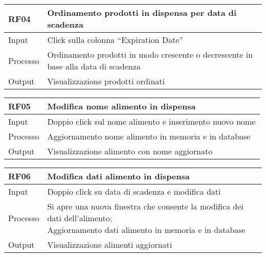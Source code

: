 \begin{table}[H]
    \begin{flushleft}
      \begin{tabular}{l|l}
        \toprule
        \textbf{RF04} & \textbf{Ordinamento prodotti in dispensa per data di scadenza}\\
        \midrule
        Input & Click sulla colonna “Expiration Date”\\
        Processo & Ordinamento prodotti in modo crescente o decrescente in base alla data di scadenza\\
        Output & Visualizzazione prodotti ordinati\\
        \bottomrule
      \end{tabular}
    \end{flushleft}
\end{table}

\begin{table}[H]
    \begin{flushleft}
      \begin{tabular}{l|l}
        \toprule
        \textbf{RF05} & \textbf{Modifica nome alimento in dispensa}\\
        \midrule
        Input & Doppio click sul nome alimento e inserimento nuovo nome\\
        Processo & Aggiornamento nome alimento in memoria e in database\\
        Output & Visualizzazione alimento con nome aggiornato\\
        \bottomrule
      \end{tabular}
    \end{flushleft}
\end{table}

\begin{table}[H]
    \begin{flushleft}
      \begin{tabular}{l|l}
        \toprule
        \textbf{RF06} & \textbf{Modifica dati alimento in dispensa}\\
        \midrule
        Input & Doppio click su data di scadenza e modifica dati\\
        Processo & \makecell{Si apre una nuova finestra che consente la modifica dei dati dell’alimento; \\ Aggiornamento dati alimento in memoria e in database}\\
        Output & Visualizzazione alimenti aggiornati\\
        \bottomrule
      \end{tabular}
    \end{flushleft}
\end{table}

